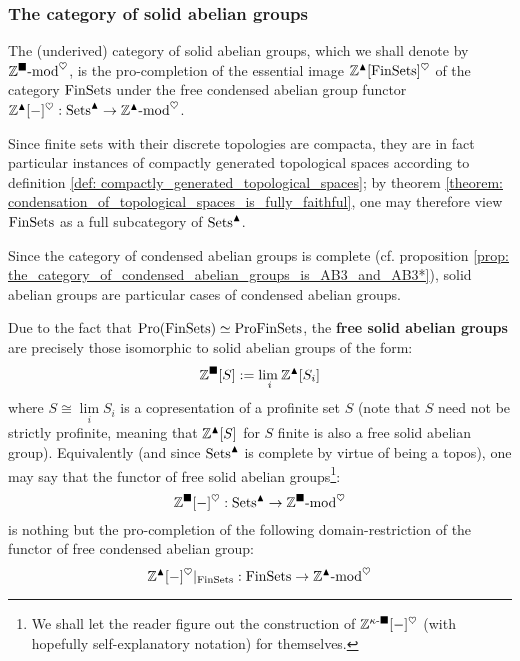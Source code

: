         \subsubsection{The category of solid abelian groups}
            \begin{definition} \label{def: solid_abelian_groups}
                The (underived) category of solid abelian groups, which we shall denote by $\mathbb{Z}^{\blacksquare}\text{-}\mathrm{mod}^{\heartsuit}$, is the pro-completion of the essential image $\mathbb{Z}^{\blacktriangle}[\mathrm{Fin}\mathrm{Sets}]^{\heartsuit}$ of the category $\mathrm{Fin}\mathrm{Sets}$ under the free condensed abelian group functor $\mathbb{Z}^{\blacktriangle}[-]^{\heartsuit}: \mathrm{Sets}^{\blacktriangle} \to \mathbb{Z}^{\blacktriangle}\text{-}\mathrm{mod}^{\heartsuit}$.
            \end{definition}
            \begin{remark}
                Since finite sets with their discrete topologies are compacta, they are in fact particular instances of compactly generated topological spaces according to definition \ref{def: compactly_generated_topological_spaces}; by theorem \ref{theorem: condensation_of_topological_spaces_is_fully_faithful}, one may therefore view $\mathrm{Fin}\mathrm{Sets}$ as a full subcategory of $\mathrm{Sets}^{\blacktriangle}$. 
            \end{remark}
            \begin{remark} \label{remark: solid_abelian_groups_are_condensed}
                Since the category of condensed abelian groups is complete (cf. proposition \ref{prop: the_category_of_condensed_abelian_groups_is_AB3_and_AB3*}), solid abelian groups are particular cases of condensed abelian groups.
            \end{remark}
            \begin{remark} \label{remark: free_solid_abelian_groups}
                Due to the fact that $\mathrm{Pro}(\mathrm{Fin}\mathrm{Sets}) \simeq \mathrm{Pro}\mathrm{Fin}\mathrm{Sets}$, the \textbf{free solid abelian groups} are precisely those isomorphic to solid abelian groups of the form:
                    $$\mathbb{Z}^{\blacksquare}[S] := \underset{i}{\operatorname{lim} \:} \mathbb{Z}^{\blacktriangle}[S_i]$$
                where $S \cong \underset{i}{\lim} S_i$ is a copresentation of a profinite set $S$ (note that $S$ need not be strictly profinite, meaning that $\mathbb{Z}^{\blacktriangle}[S]$ for $S$ finite is also a free solid abelian group). Equivalently (and since $\mathrm{Sets}^{\blacktriangle}$ is complete by virtue of being a topos), one may say that the functor of free solid abelian groups\footnote{We shall let the reader figure out the construction of $\mathbb{Z}^{\kappa\text{-}\blacksquare}[-]^{\heartsuit}$ (with hopefully self-explanatory notation) for themselves.}:
                    $$\mathbb{Z}^{\blacksquare}[-]^{\heartsuit}: \mathrm{Sets}^{\blacktriangle} \to \mathbb{Z}^{\blacksquare}\text{-}\mathrm{mod}^{\heartsuit}$$
                is nothing but the pro-completion of the following domain-restriction of the functor of free condensed abelian group:
                    $$\mathbb{Z}^{\blacktriangle}[-]^{\heartsuit}|_{\mathrm{Fin}\mathrm{Sets}}: \mathrm{Fin}\mathrm{Sets} \to \mathbb{Z}^{\blacktriangle}\text{-}\mathrm{mod}^{\heartsuit}$$
            \end{remark}
